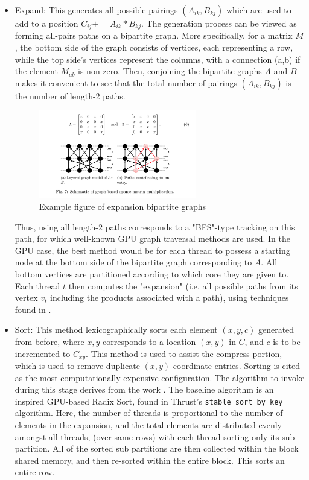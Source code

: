 \documentclass[12pt]{article}
\def\code#1{\texttt{#1}}
\begin{document}
\begin{itemize}
\item Expand: This generates all possible pairings $(A_{ik}, B_{kj})$ which are used to add to a position $C_{ij} += A_{ik}*B_{kj}$. The generation process can be viewed as forming all-pairs paths on a bipartite graph. More specifically, for a matrix $M$, the bottom side of the graph consists of vertices, each representing a row, while the top side's vertices represent the columns, with a connection (a,b) if the element $M_{ab}$ is non-zero. Then, conjoining the bipartite graphs $A$ and $B$ makes it convenient to see that the total number of pairings $(A_{ik}, B_{kj})$ is the number of length-2 paths. 

\begin{figure}[h]
  \caption{Example figure of expansion bipartite graphs}
  \centering 
  \includegraphics[width = 0.65\textwidth]{bipartite_MM.png}
\end{figure}
\hspace{0.5cm}Thus, using all length-2 paths corresponds to a "BFS"-type tracking on this path, for which well-known GPU graph traversal methods are used. In the GPU case, the best method would be for each thread to possess a starting node at the bottom side of the bipartite graph corresponding to $A$. All bottom vertices are partitioned according to which core they are given to. Each thread $t$ then computes the "expansion" (i.e. all possible paths from its vertex $v_{t}$ including the products associated with a path), using techniques found in \cite{bfs_gpu}. 
\item Sort: This method lexicographically sorts each element $(x,y, c)$ generated from before, where $x,y$ corresponds to a location $(x,y)$ in $C$, and $c$ is to be incremented to $C_{xy}$. This method is used to assist the compress portion, which is used to remove duplicate $(x,y)$ coordinate entries. Sorting is cited as the most computationally expensive configuration. The algorithm to invoke during this stage derives from the work \cite{sort}. The baseline algorithm is an inspired GPU-based Radix Sort, found in Thrust's \code{stable\_sort\_by\_key} algorithm. Here, the number of threads is proportional to the number of elements in the expansion, and the total elements are distributed evenly amongst all threads, (over same rows) with each thread sorting only its sub partition. All of the sorted sub partitions are then collected within the block shared memory, and then re-sorted within the entire block. This sorts an entire row.  




\end{itemize}
\end{document}
